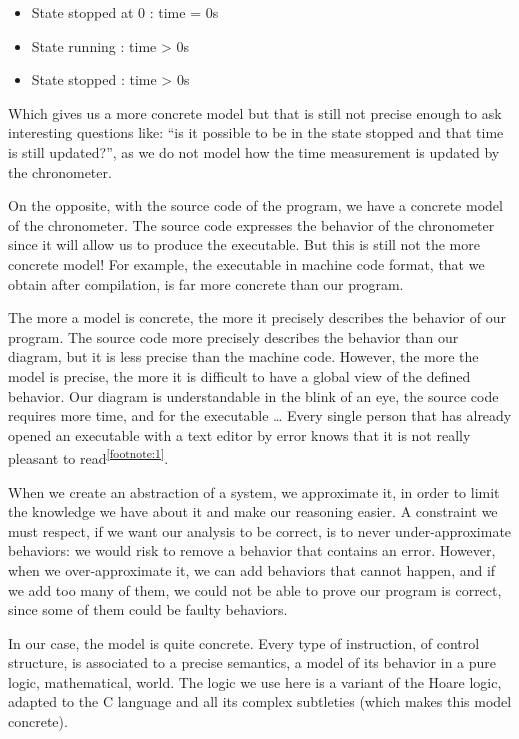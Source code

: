 \begin{itemize}
\item State stopped at 0 : time = 0s
\item State running : time > 0s
\item State stopped : time > 0s
\end{itemize}



Which gives us a more concrete model but that is still not precise
enough to ask interesting questions like: ``is it possible to be in the
state stopped and that time is still updated?'', as we do not model how
the time measurement is updated by the chronometer.



On the opposite, with the source code of the program, we have a concrete
model of the chronometer. The source code expresses the behavior of the
chronometer since it will allow us to produce the executable. But this
is still not the more concrete model! For example, the executable in
machine code format, that we obtain after compilation, is far more
concrete than our program.



The more a model is concrete, the more it precisely describes the
behavior of our program. The source code more precisely describes the
behavior than our diagram, but it is less precise than the machine code.
However, the more the model is precise, the more it is difficult to have
a global view of the defined behavior. Our diagram is understandable in
the blink of an eye, the source code requires more time, and for the
executable \ldots{} Every single person that has already opened an
executable with a text editor by error knows that it is not really
pleasant to read\textsuperscript{\ref{footnote:1}}.



When we create an abstraction of a system, we approximate it, in order
to limit the knowledge we have about it and make our reasoning easier. A
constraint we must respect, if we want our analysis to be correct, is to
never under-approximate behaviors: we would risk to remove a behavior
that contains an error. However, when we over-approximate it, we can add
behaviors that cannot happen, and if we add too many of them, we could
not be able to prove our program is correct, since some of them could be
faulty behaviors.



In our case, the model is quite concrete. Every type of instruction, of
control structure, is associated to a precise semantics, a model of its
behavior in a pure logic, mathematical, world. The logic we use here is
a variant of the Hoare logic, adapted to the C language and all its
complex subtleties (which makes this model concrete).

